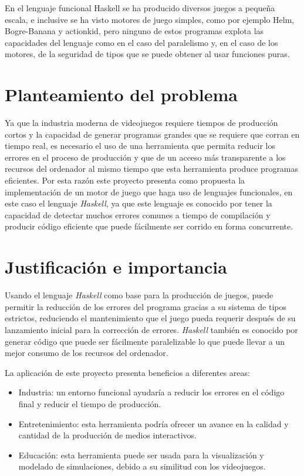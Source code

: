 En el lenguaje funcional Haskell se ha producido diversos juegos a pequeña escala, e inclusive se ha visto motores de juego simples, como por ejemplo Helm, Bogre-Banana y actionkid, pero ninguno de estos programas explota las capacidades del lenguaje como en el caso del paralelismo y, en el caso de los motores, de la seguridad de tipos que se puede obtener al usar funciones puras.

\section{Planteamiento del problema}

Ya que la industria moderna de videojuegos requiere tiempos de producción cortos y la capacidad de generar programas grandes que se requiere que corran en tiempo real, es necesario el uso de una herramienta que permita reducir los errores en el proceso de producción y que de un acceso más transparente a los recursos del ordenador al mismo tiempo que esta herramienta produce programas eficientes. Por esta razón este proyecto presenta como propuesta la implementación de un motor de juego que haga uso de lenguajes funcionales, en este caso el lenguaje \emph{Haskell}, ya que este lenguaje es conocido por tener la capacidad de detectar muchos errores comunes a tiempo de compilación y producir código eficiente que puede fácilmente ser corrido en forma concurrente.

\section{Justificación e importancia}

Usando el lenguaje \emph{Haskell} como base para la producción de juegos, puede permitir la reducción de los errores del programa gracias a su sistema de tipos estrictos, reduciendo el mantenimiento que el juego pueda requerir después de su lanzamiento inicial para la corrección de errores. \emph{Haskell} también es conocido por generar código que puede ser fácilmente paralelizable lo que puede llevar a un mejor consumo de los recursos del ordenador.

 La aplicación de este proyecto presenta beneficios a diferentes areas:

\begin{itemize}
\item Industria: un entorno funcional ayudaría a reducir los errores en el código final y reducir el tiempo de producción.
\item Entretenimiento: esta herramienta podría ofrecer un avance en la calidad y cantidad de la producción de medios interactivos.
\item Educación: esta herramienta puede ser usada para la visualización y modelado de simulaciones, debido a su similitud con los videojuegos.
\end{itemize}


